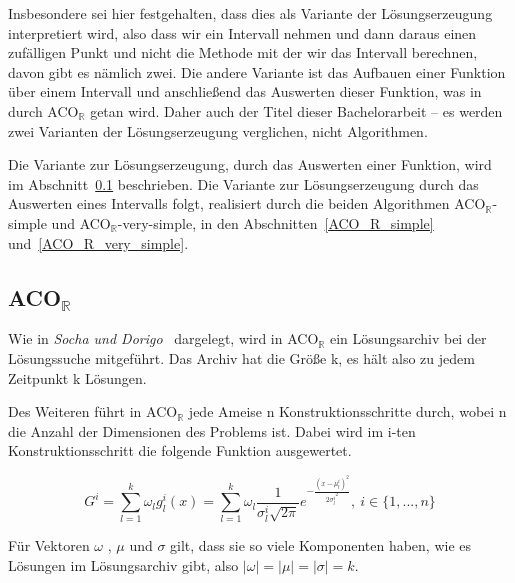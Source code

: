 \documentclass[fontsize=12, a4aper]{scrartcl}
\begin{document}
	Insbesondere sei hier festgehalten, dass dies als Variante der Lösungserzeugung interpretiert wird, also dass wir ein Intervall nehmen und dann daraus einen zufälligen Punkt und nicht die Methode mit der wir das Intervall berechnen, davon gibt es nämlich zwei. Die andere Variante ist das Aufbauen einer Funktion über einem Intervall und anschließend das Auswerten dieser Funktion, was in \cite{socha2008ant} durch ACO\(_{\mathbb{R}}\) getan wird. Daher auch der Titel dieser Bachelorarbeit -- es werden zwei Varianten der Lösungserzeugung verglichen, nicht Algorithmen.\hfill\newline
	
	Die Variante zur Lösungserzeugung, durch das Auswerten einer Funktion, wird im Abschnitt~\ref{ACO_R} beschrieben. Die Variante zur Lösungserzeugung durch das Auswerten eines Intervalls folgt, realisiert durch die beiden Algorithmen ACO\(_{\mathbb{R}}\)-simple und ACO\(_{\mathbb{R}}\)-very-simple, in den Abschnitten~\ref{ACO_R_simple} und~\ref{ACO_R_very_simple}.\hfill\newline
	
	\subsection{ACO\(_{\mathbb{R}}\)} \label{ACO_R}
	
	Wie in \textit{Socha und Dorigo}~\cite{socha2008ant} dargelegt, wird in ACO\(_{\mathbb{R}}\) ein Lösungsarchiv bei der Lösungssuche mitgeführt. Das Archiv hat die Größe k, es hält also zu jedem Zeitpunkt k Lösungen.\hfill\newline
	
	\noindent Des Weiteren führt in ACO\(_{\mathbb{R}}\) jede Ameise n Konstruktionsschritte durch, wobei n die Anzahl der Dimensionen des Problems ist. Dabei wird im i-ten Konstruktionsschritt die folgende Funktion ausgewertet.\hfill\newline
	
	\begin{equation}
	G^i=\sum_{l=1}^{k} \omega_l g^i_l(x)=\sum_{l=1}^{k} \omega_l \frac{1}{ \sigma^i_l \sqrt{2\pi} }e^{-\frac{(x-\mu^i_l)^2}{2 {\sigma^i_l}^2}}, ~  i \in \{1, ..., n\}
	\end{equation}
	
	\noindent Für Vektoren \(\omega\) , \(\mu\) und \(\sigma\) gilt, dass sie so viele Komponenten haben, wie es Lösungen im Lösungsarchiv gibt, also \(|\omega| = |\mu| = |\sigma| = k \).\hfill\newline
	
\end{document}
